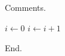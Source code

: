 \documentclass{article}
\begin{document}
Comments.

\begin{algorithm}[h]
\caption{Comments}
\begin{algorithmic}[1]
\STATE $i \gets 0$ 
\STATE $i \gets i + 1$
\ENDIF
\end{algorithmic}
\end{algorithm}

End.
\end{document}
